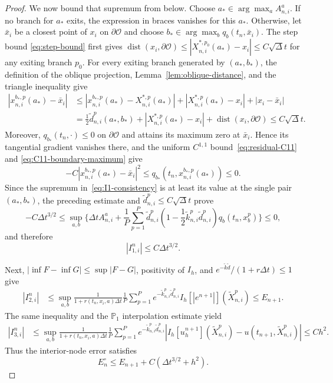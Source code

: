 \documentclass[11pt]{article}
\theoremstyle{definition}
\theoremstyle{remark}
\newcommand{\cO}{\mathcal{O}}
\newcommand{\dist}{\operatorname{dist}}
\newcommand{\dt}{\Delta t}
\begin{document}
\begin{proof}
		We now bound that supremum from below.  Choose
		$a_*\in\arg\max_a A_{n,i}^a$.  If no branch for $a_*$ exits, the expression
		in braces vanishes for this $a_*$.  Otherwise, let $\bar x_i$ be a closest
		point of $x_i$ on $\partial\cO$ and choose
		$b_*\in\arg\max_b q_b(t_n,\bar x_i)$.  The step bound
		\eqref{eq:step-bound} first gives
		$\dist(x_i,\partial\cO)\le|X_{n,i}^{*,p_0}(a_*)-x_i|\le C\sqrt\dt$
		for any exiting branch $p_0$.  For every exiting branch generated by
		$(a_*,b_*)$, the definition of the oblique projection,
		Lemma~\ref{lem:oblique-distance}, and the triangle inequality give
		\[
		\begin{aligned}
			|x_{n,i}^{b_*,p}(a_*)-\bar x_i|
			&\le |x_{n,i}^{b_*,p}(a_*)-X_{n,i}^{*,p}(a_*)|
			+|X_{n,i}^{*,p}(a_*)-x_i|+|x_i-\bar x_i|\\
			&=\frac12\widetilde d_{n,i}^p(a_*,b_*)
			+|X_{n,i}^{*,p}(a_*)-x_i|
			+\dist(x_i,\partial\cO)
			\le C\sqrt\dt .
		\end{aligned}
		\]
		Moreover, $q_{b_*}(t_n,\cdot)\le0$ on $\partial\cO$ and attains its maximum
		zero at $\bar x_i$.  Hence its tangential gradient vanishes there, and the
		uniform $C^{1,1}$ bound~\eqref{eq:residual-C11} and
		\eqref{eq:C11-boundary-maximum} give
		\[
		-C|x_{n,i}^{b_*,p}(a_*)-\bar x_i|^2
		\le q_{b_*}(t_n,x_{n,i}^{b_*,p}(a_*))\le0.
		\]
		Since the supremum in~\eqref{eq:I1-consistency} is at least its value at
		the single pair $(a_*,b_*)$, the preceding estimate and
		$\widetilde d_{n,i}^p\le C\sqrt\dt$ prove
		\[
		-C\dt^{3/2}\le
		\sup_{a,b}\Biggl\{\dt A_{n,i}^a
		+\frac1P\sum_{p=1}^P\widetilde d_{n,i}^p
		\left(1-\frac12\widetilde k_{n,i}^p\widetilde d_{n,i}^p\right)
		q_b(t_n,x_b^p)\Biggr\}\le0,
		\]
		and therefore
		\begin{equation}
			|I_{1,i}^n|\le C\dt^{3/2}.
			\label{eq:I1-bound}
		\end{equation}
		
		Next, $|\inf F-\inf G|\le\sup|F-G|$, positivity of $I_h$, and
		$e^{-\widetilde k\widetilde d}/(1+r\dt)\le1$ give
		\begin{align}
			|I_{2,i}^n|
			&\le\sup_{a,b}
			\frac1{1+r(t_n,x_i,a)\dt}\frac1P\sum_{p=1}^P
			e^{-\widetilde k_{n,i}^p\widetilde d_{n,i}^p}
			I_h[|e^{n+1}|](\widetilde X_{n,i}^p)
			\le E_{n+1}.
			\label{eq:I2-bound}
		\end{align}
		The same inequality and the $\mathbb P_1$ interpolation estimate yield
		\begin{align}
			|I_{3,i}^n|
			&\le\sup_{a,b}
			\frac1{1+r(t_n,x_i,a)\dt}\frac1P\sum_{p=1}^P
			e^{-\widetilde k_{n,i}^p\widetilde d_{n,i}^p}
			\left|I_h[u_h^{n+1}](\widetilde X_{n,i}^p)
			-u(t_{n+1},\widetilde X_{n,i}^p)\right|
			\le Ch^2.
			\label{eq:I3-bound}
		\end{align}
		Thus the interior-node error satisfies
		\begin{equation}
			E_n^\circ\le E_{n+1}+C(\dt^{3/2}+h^2).
			\label{eq:smooth-interior-defect}
		\end{equation}
		

\end{proof}
\end{document}
